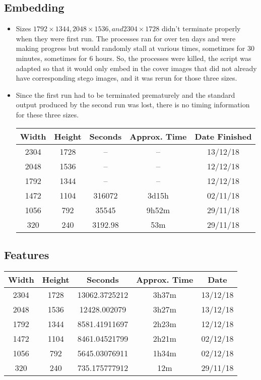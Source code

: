 \subsection{Embedding}
\begin{itemize}
  \item Sizes $1792 \times 1344, 2048 \times 1536, and 2304 \times 1728$ didn't terminate properly when they were first run. The processes ran for over ten days and were making progress but would randomly stall at various times, sometimes for 30 minutes, sometimes for 6 hours. So, the processes were killed, the script was adapted so that it would only embed in the cover images that did not already have corresponding stego images, and it was rerun for those three sizes.
  \item Since the first run had to be terminated prematurely and the standard output produced by the second run was lost, there is no timing information for these three sizes.
  \begin{center}
  \begin{tabular}{ c c | c c c }
  Width & Height & Seconds & Approx. Time & Date Finished \\ \hline
  2304 & 1728 & -- & -- & 13/12/18 \\
  2048 & 1536 & -- & -- & 12/12/18 \\
  1792 & 1344 & -- & -- & 12/12/18 \\
  1472 & 1104 & 316072 & 3d15h & 02/11/18 \\
  1056 & 792 & 35545 & 9h52m & 29/11/18 \\
  320 & 240 & 3192.98 & 53m & 29/11/18 \\
  \end{tabular}
  \end{center}
\end{itemize}

\subsection{Features}
  \begin{center}
  \begin{tabular}{ c c | c c c }
  Width & Height & Seconds & Approx. Time & Date \\ \hline
  2304 & 1728 & 13062.3725212 & 3h37m & 13/12/18 \\
  2048 & 1536 & 12428.002079 & 3h27m & 13/12/18 \\
  1792 & 1344 & 8581.41911697 & 2h23m & 12/12/18 \\
  1472 & 1104 & 8461.04521799 & 2h21m & 02/12/18 \\
  1056 & 792 & 5645.03076911 & 1h34m & 02/12/18 \\
  320 & 240 & 735.175777912 & 12m & 29/11/18 \\
  \end{tabular}
  \end{center}

